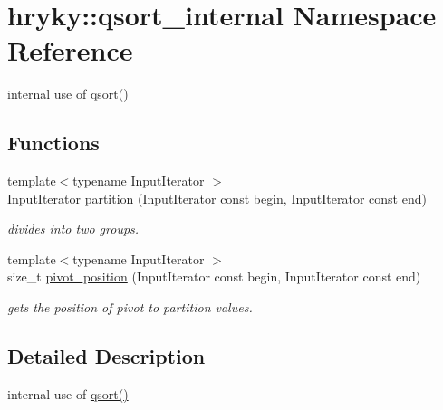 \hypertarget{namespacehryky_1_1qsort__internal}{\section{hryky\-:\-:qsort\-\_\-internal Namespace Reference}
\label{namespacehryky_1_1qsort__internal}
}


internal use of \hyperlink{namespacehryky_a438e3ee8f5109856c4a1e4daa9980982}{qsort()}  


\subsection*{Functions}
\begin{DoxyCompactItemize}
\item 
{\footnotesize template$<$typename Input\-Iterator $>$ }\\Input\-Iterator \hyperlink{namespacehryky_1_1qsort__internal_ac2e850d235f7ec38a913c4ea71d2970e}{partition} (Input\-Iterator const begin, Input\-Iterator const end)
\begin{DoxyCompactList}\small\item\em divides into two groups. \end{DoxyCompactList}\item 
{\footnotesize template$<$typename Input\-Iterator $>$ }\\size\-\_\-t \hyperlink{namespacehryky_1_1qsort__internal_a2a9908c1e249d16e6701c06e341f9e1d}{pivot\-\_\-position} (Input\-Iterator const begin, Input\-Iterator const end)
\begin{DoxyCompactList}\small\item\em gets the position of pivot to partition values. \end{DoxyCompactList}\end{DoxyCompactItemize}


\subsection{Detailed Description}
internal use of \hyperlink{namespacehryky_a438e3ee8f5109856c4a1e4daa9980982}{qsort()} 

